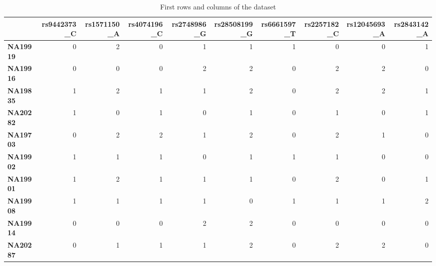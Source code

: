 \documentclass[a4paper, 11pt]{article}
\theoremstyle{definition}
\theoremstyle{remark}
\begin{document}
\begin{table}[!h]
\renewcommand{\arraystretch}{1.5}
\begin{adjustbox}{width=1\textwidth}
\begin{tabular}{lrrrrrrrrr}
{} &  \textbf{rs9442373\_C} &  \textbf{rs1571150\_A} &  \textbf{rs4074196\_C} &  \textbf{rs2748986\_G} &  \textbf{rs28508199\_}G &  \textbf{rs6661597\_T} &  \textbf{rs2257182\_C} &  \textbf{rs12045693\_}A &  \textbf{rs2843142\_A} \\
\hline
\textbf{NA19919} &            0 &            2 &            0 &            1 &             1 &            1 &            0 &             0 &            1 \\
\textbf{NA19916} &            0 &            0 &            0 &            2 &             2 &            0 &            2 &             2 &            0 \\
\textbf{NA19835} &            1 &            2 &            1 &            1 &             2 &            0 &            2 &             2 &            1 \\
\textbf{NA20282} &            1 &            0 &            1 &            0 &             1 &            0 &            1 &             0 &            1 \\
\textbf{NA19703} &            0 &            2 &            2 &            1 &             2 &            0 &            2 &             1 &            0 \\
\textbf{NA19902} &            1 &            1 &            1 &            0 &             1 &            1 &            1 &             0 &            0 \\
\textbf{NA19901} &            1 &            2 &            1 &            1 &             1 &            0 &            2 &             0 &            1 \\
\textbf{NA19908} &            1 &            1 &            1 &            1 &             0 &            1 &            1 &             1 &            2 \\
\textbf{NA19914} &            0 &            0 &            0 &            2 &             2 &            0 &            0 &             0 &            0 \\
\textbf{NA20287} &            0 &            1 &            1 &            1 &             2 &            0 &            2 &             2 &            0 \\
\end{tabular}
\end{adjustbox}
\caption{First rows and columns of the dataset}
\end{table}
\end{document}
